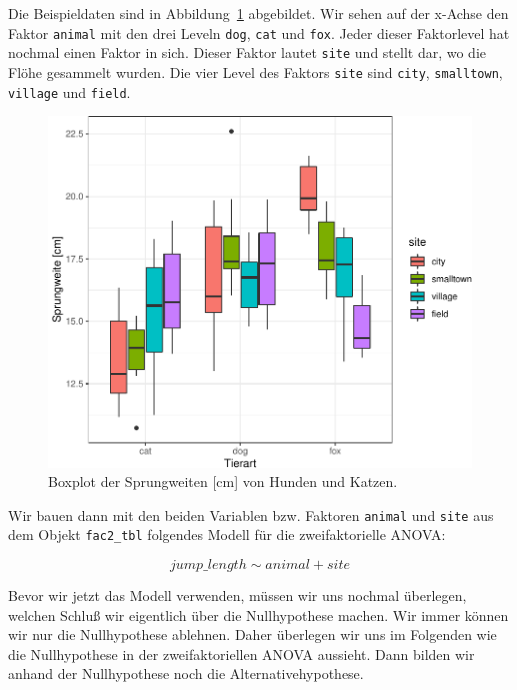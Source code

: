 \documentclass[
  letterpaper,
]{scrbook}
\begin{document}
Die Beispieldaten sind in Abbildung~\ref{fig-boxplot-anova-2}
abgebildet. Wir sehen auf der x-Achse den Faktor \texttt{animal} mit den
drei Leveln \texttt{dog}, \texttt{cat} und \texttt{fox}. Jeder dieser
Faktorlevel hat nochmal einen Faktor in sich. Dieser Faktor lautet
\texttt{site} und stellt dar, wo die Flöhe gesammelt wurden. Die vier
Level des Faktors \texttt{site} sind \texttt{city}, \texttt{smalltown},
\texttt{village} und \texttt{field}.

\begin{figure}

{\centering \includegraphics{./stat-tests-anova_files/figure-pdf/fig-boxplot-anova-2-1.pdf}

}

\caption{\label{fig-boxplot-anova-2}Boxplot der Sprungweiten {[}cm{]}
von Hunden und Katzen.}

\end{figure}

Wir bauen dann mit den beiden Variablen bzw. Faktoren \texttt{animal}
und \texttt{site} aus dem Objekt \texttt{fac2\_tbl} folgendes Modell für
die zweifaktorielle ANOVA:

\[
jump\_length \sim animal + site
\]

Bevor wir jetzt das Modell verwenden, müssen wir uns nochmal überlegen,
welchen Schluß wir eigentlich über die Nullhypothese machen. Wir immer
können wir nur die Nullhypothese ablehnen. Daher überlegen wir uns im
Folgenden wie die Nullhypothese in der zweifaktoriellen ANOVA aussieht.
Dann bilden wir anhand der Nullhypothese noch die Alternativehypothese.
\end{document}
